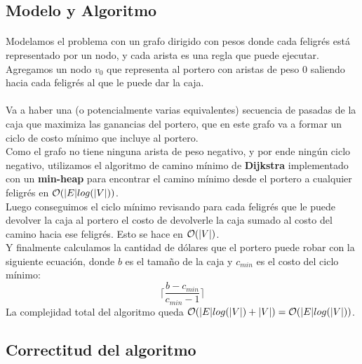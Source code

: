 \documentclass[../main.tex]{subfiles}
\begin{document}
\subsection{Modelo y Algoritmo}
\label{sec:ej3-model}
\paragraph{} Modelamos el problema con un grafo dirigido con pesos donde cada feligrés está representado por un nodo, y cada arista es una regla que puede ejecutar. Agregamos un nodo \(v_{0}\) que representa al portero con aristas de peso 0 saliendo hacia cada feligrés al que le puede dar la caja.

\paragraph{} Va a haber una (o potencialmente varias equivalentes) secuencia de pasadas de la caja que maximiza las ganancias del portero, que en este grafo va a formar un ciclo de costo mínimo que incluye al portero. \\
Como el grafo no tiene ninguna arista de peso negativo, y por ende ningún ciclo negativo, utilizamos el algoritmo de camino mínimo de \textbf{Dijkstra} implementado con un \textbf{min-heap} para encontrar el camino mínimo desde el portero a cualquier feligrés en \(\mathcal{O}(|E|log(|V|))\). \\
Luego conseguimos el ciclo mínimo revisando para cada feligrés que le puede devolver la caja al portero el costo de devolverle la caja sumado al costo del camino hacia ese feligrés. Esto se hace en \(\mathcal{O}(|V|)\). \\
Y finalmente calculamos la cantidad de dólares que el portero puede robar con la siguiente ecuación, donde \(b\) es el tamaño de la caja y \(c_{min}\) es el costo del ciclo mínimo: \\
\[
  \Big\lceil\dfrac{b - c_{min}}{c_{min}-1}\Big\rceil
  \]
La complejidad total del algoritmo queda \(\mathcal{O}(|E|log(|V|) + |V|) = \mathcal{O}(|E|log(|V|))\).

\subsection{Correctitud del algoritmo}
\label{sec:ej3-proof}
\end{document}
